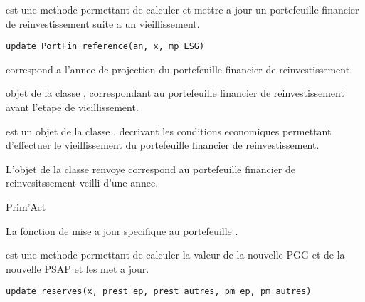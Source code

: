 \documentclass[a4paper]{book}
\begin{document}
%
\begin{Description}\relax
{} est une methode permettant de calculer et mettre a jour un portefeuille financier
de reinvestissement suite a un vieillissement.
\end{Description}
%
\begin{Usage}
\begin{verbatim}
update_PortFin_reference(an, x, mp_ESG)
\end{verbatim}
\end{Usage}
%
\begin{Arguments}
\begin{ldescription}
\item[\code{an}]  correspond a l'annee de projection du portefeuille financier de reinvestissement.

\item[\code{x}] objet de la classe , correspondant au portefeuille financier de reinvestissement avant l'etape de vieillissement.

\item[\code{mp\_ESG}] est un objet de la classe , decrivant les conditions economiques permettant d'effectuer le vieillissement du portefeuille financier de reinvestissement.
\end{ldescription}
\end{Arguments}
%
\begin{Value}
L'objet de la classe  renvoye correspond au portefeuille financier de reinvesitssement veilli d'une annee.
\end{Value}
%
\begin{Author}\relax
Prim'Act
\end{Author}
%
\begin{SeeAlso}\relax
La fonction de mise a jour specifique au portefeuille .
\end{SeeAlso}
%
\begin{Description}\relax
{} est une methode permettant de calculer la valeur de la nouvelle PGG et de la nouvelle
PSAP et les met a jour.
\end{Description}
%
\begin{Usage}
\begin{verbatim}
update_reserves(x, prest_ep, prest_autres, pm_ep, pm_autres)
\end{verbatim}
\end{Usage}
\end{document}
